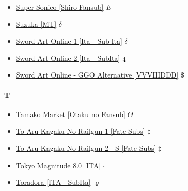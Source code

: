 \begin{itemize}
				\item \href{https://mega.nz/#F!It4BFDJL!38p6Lb3Ehugw82qL4puxGg} {Super Sonico [Shiro Fansub]}  $E$ \\ 
				\item \href{https://mega.nz/#F!tJIn1BKT!mWgVnUF-uZAtEa7ZAKoAEA} {Suzuka [MT]}  $\delta$ \\ 
				\item \href{https://mega.nz/#F!4Z5xkIwI!6h1qNqinWotrp90PcZ1v_A} {Sword Art Online 1 [Ita - Sub Ita]}  $\delta$ \\ 
				\item \href{https://mega.nz/#F!WGY3XJrI!rmV1KMVTSWl4uPw0_JCE7Q} {Sword Art Online 2 [Ita - SubIta]}  $\oldstylenums{4}$ \\ 
				\item \href{https://mega.nz/#F!CO5kDAbA!vSqksb-P0zoJKRBNeinCjQ} {Sword Art Online - GGO Alternative [VVVIIIDDD]}  $\$$ \\ 
			
			\end{itemize}	
		
		\paragraph{T} \hypertarget{ST}{}
			\begin{itemize}
				
				\item \href{https://mega.nz/#F!pSxFUKrZ!yi3ut_8UTiARk-MCcr7Jjg} {Tamako Market [Otaku no Fansub]}  $\varTheta$ \\ 
				\item \href{https://mega.nz/#F!brZVGAQI!aIKz0VP-bvKBaxV8fCPjKA} {To Aru Kagaku No Railgun 1 [Fate-Subs]}  $\ddag$ \\ 
				\item \href{https://mega.nz/#F!D6RxhYgI!tniuz0OvjQ7lFKdXCyQHgw} {To Aru Kagaku No Railgun 2 - S [Fate-Subs]}  $\ddag$ \\   
				\item \href{https://mega.nz/#F!bwtG2LBZ!eF938Bun6B6oD1uN8E0cwg} {Tokyo Magnitude 8.0 [ITA]}  $\square$ \\  
				\item \href{https://mega.nz/#F!cbBlwRza!_sYm7gHbI_yqsCUsfXKX0g} {Toradora [ITA - SubIta]}  $\varrho$ \\ 
			
			\end{itemize}
		
		
